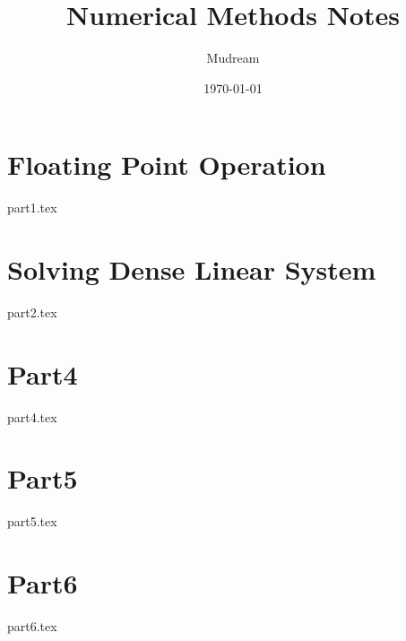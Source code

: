 \documentclass{article}
\title{Numerical Methods Notes}
\author{Mudream}
\date{\today}
\begin{document}
    \maketitle
    \part{Floating Point Operation}
    {part1.tex}
    \part{Solving Dense Linear System}
    {part2.tex}
    \part{Part4}
    {part4.tex}
    \part{Part5}
    {part5.tex}
    \part{Part6}
    {part6.tex}
\end{document}
